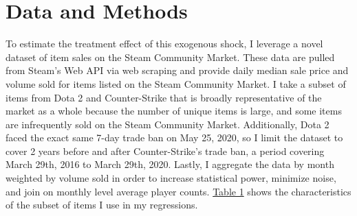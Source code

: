 \documentclass[12pt,letterpaper]{article}
\begin{document}
\section{Data and Methods}
To estimate the treatment effect of this exogenous shock, I leverage a novel dataset of item sales on the Steam Community Market. These data are pulled from Steam's Web API via web scraping and provide daily median sale price and volume sold for items listed on the Steam Community Market. I take a subset of items from Dota 2 and Counter-Strike that is broadly representative of the market as a whole because the number of unique items is large, and some items are infrequently sold on the Steam Community Market. Additionally, Dota 2 faced the exact same 7-day trade ban on May 25, 2020, so I limit the dataset to cover 2 years before and after Counter-Strike's trade ban, a period covering March 29th, 2016 to March 29th, 2020. Lastly, I aggregate the data by month weighted by volume sold in order to increase statistical power, minimize noise, and join on monthly level average player counts. \hyperref[tab:cs-dota2-compare]{Table 1} shows the characteristics of the subset of items I use in my regressions. \\

\end{document}
